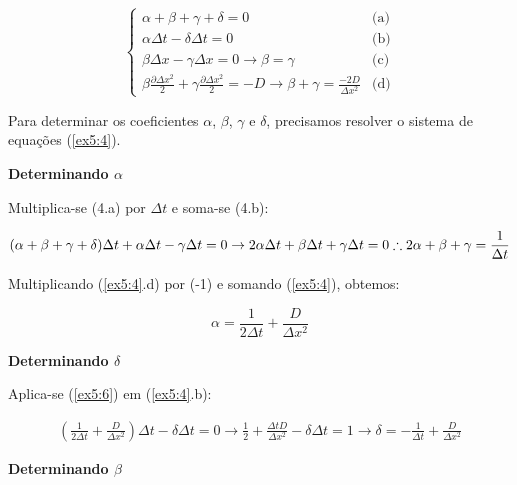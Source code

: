 \documentclass[11pt]{article}
\begin{document}
\begin{equation}
  \begin{cases}
    \alpha + \beta + \gamma + \delta = 0 & \text{(a)}\\
    \alpha \Delta{t} - \delta \Delta{t} = 0  & \text{(b)} \\
    \beta \Delta{x} - \gamma \Delta{x} = 0 \to \beta = \gamma & \text{(c)}\\
    \beta \frac{\partial{\Delta{x^2}}}{2} + \gamma \frac{\partial{\Delta{x^2}}}{2} = -D \to \beta + \gamma = \frac{-2D}{\Delta{x^2}} & \text{(d)}
  \end{cases}
  \label{ex5:4}
\end{equation}

Para determinar os coeficientes \(\alpha\), \(\beta\), \(\gamma\) e
\(\delta\), precisamos resolver o sistema de equações (\ref{ex5:4}).

\textbf{Determinando \(\alpha\)}

Multiplica-se (4.a) por \(\Delta{t}\) e soma-se (4.b):

\begin{equation}
    (\alpha + \beta + \gamma + \delta)\Delta{t} + \alpha \Delta{t} - \gamma \Delta{t} = 0 \to 2\alpha{\Delta{t}} + \beta{\Delta{t}} + \gamma{\Delta{t}} = 0 \\
    \therefore 2\alpha + \beta + \gamma = \frac{1}{\Delta{t}}
    \label{ex5:5}
\end{equation}

Multiplicando (\ref{ex5:4}.d) por (-1) e somando (\ref{ex5:4}), obtemos:

\begin{equation}
    \alpha = \frac{1}{2\Delta{t}} + \frac{D}{\Delta{x^2}}
    \label{ex5:6}
\end{equation}

\textbf{Determinando \(\delta\)}

Aplica-se (\ref{ex5:6}) em (\ref{ex5:4}.b):

\begin{equation}
    \begin{aligned}
        (\frac{1}{2\Delta{t}} + \frac{D}{\Delta{x^2}})\Delta{t} - \delta \Delta{t} = 0 \to  \frac{1}{2} + \frac{\Delta{t}D}{\Delta{x^2}} - \delta{\Delta{t}} = 1 \to \delta = -\frac{1}{\Delta{t}} + \frac{D}{\Delta{x^2}}
    \end{aligned}
    \label{ex5:7}
\end{equation}

\textbf{Determinando \(\beta\)}
\end{document}
